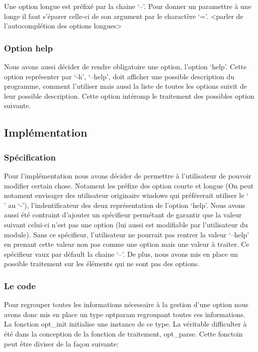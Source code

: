\documentclass[12pt]{article}
\begin{document}
    Une option longue est préfixé par la chaine `--'. Pour donner un paramettre 
    à une longe il faut s'éparer celle-ci de son argument par le charactère `='. 
    <parler de l'autocomplétion des options longues>

    \subsubsection{Option help}

    Nous avons aussi décider de rendre obligatoire une option, l'option `help'.
    Cette option représenter par `-h', `--help', doit afficher une possible 
    description du programme, comment l'utiliser mais aussi la liste de toutes 
    les options suivit de leur possible description. Cette option intéromp le 
    traitement des possibles option suivante. 

    \subsection{Implémentation}

    \subsubsection{Spécification}

    Pour l'implémentation nous avons décider de permettre à l'utilisateur de 
    pouvoir modifier certain chose. Notament les préfixe des option courte et 
    longue (On peut notament envisager des utilisateur originaire windows qui 
    préférerait utiliser le `\\' au `-'), l'indentificateur des deux 
    représentation de l'option `help'. Nous avons aussi été contraint d'ajouter 
    un spécifieur permétant de garantir que la valeur suivant celui-ci n'est pas
    une option (lui aussi est modifiable par l'utilisateur du module). Sans ce 
    spécifieur, l'utilisateur ne pourrait pas rentrer la valeur `--help' en 
    prenant cette valeur non pas comme une option mais une valeur à traiter. Ce 
    spécifieur vaux par défault la chaine `--'. De plus, nous avons mis en place 
    un possible traitement sur les éléments qui ne sont pas des options.
    
    \subsubsection{Le code}

    Pour regrouper toutes les informations nécessaire à la gestion d'une option 
    nous avons donc mis en place un type optparam regroupant toutes ces 
    informations. La fonction opt\_init initialise une instance de ce type. La 
    véritable difficulter à été dans la conception de la fonction de traitement,
    opt\_parse. Cette fonctoin peut être diviser de la façon suivante:
\end{document}
